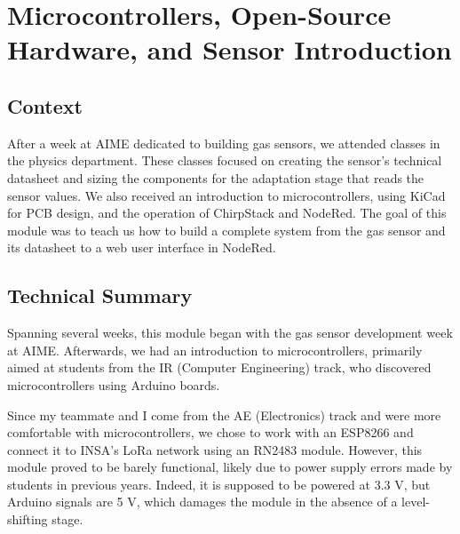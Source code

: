 


\section{Microcontrollers, Open-Source Hardware, and Sensor Introduction}

\subsection{Context}

\indent \indent After a week at AIME dedicated to building gas sensors, we attended classes in the physics department. These classes focused on creating the sensor's technical datasheet and sizing the components for the adaptation stage that reads the sensor values. We also received an introduction to microcontrollers, using KiCad for PCB design, and the operation of ChirpStack and NodeRed. The goal of this module was to teach us how to build a complete system from the gas sensor and its datasheet to a web user interface in NodeRed.

\subsection{Technical Summary}

\indent \indent Spanning several weeks, this module began with the gas sensor development week at AIME. Afterwards, we had an introduction to microcontrollers, primarily aimed at students from the IR (Computer Engineering) track, who discovered microcontrollers using Arduino boards.

Since my teammate and I come from the AE (Electronics) track and were more comfortable with microcontrollers, we chose to work with an ESP8266 and connect it to INSA's LoRa network using an RN2483 module. However, this module proved to be barely functional, likely due to power supply errors made by students in previous years. Indeed, it is supposed to be powered at 3.3 V, but Arduino signals are 5 V, which damages the module in the absence of a level-shifting stage.

